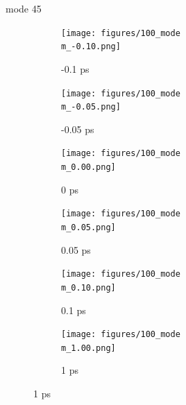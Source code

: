 \documentclass{beamer}
\newcommand\w{0.32}
\begin{document}
\renewcommand\m{45}
\begin{frame}{mode \m}
	\begin{figure}
		\centering
		\begin{subfigure}[b]{\w\textwidth}
			\centering
			\texttt{[image: figures/100\_mode\\m\_-0.10.png]}
			\caption{-0.1 ps}
		\end{subfigure}
		\begin{subfigure}[b]{\w\textwidth}
			\centering
			\texttt{[image: figures/100\_mode\\m\_-0.05.png]}
			\caption{-0.05 ps}
		\end{subfigure}
		\begin{subfigure}[b]{\w\textwidth}
			\centering
			\texttt{[image: figures/100\_mode\\m\_0.00.png]}
			\caption{0 ps}
		\end{subfigure}
		\begin{subfigure}[b]{\w\textwidth}
			\centering
			\texttt{[image: figures/100\_mode\\m\_0.05.png]}
			\caption{0.05 ps}
		\end{subfigure}
		\begin{subfigure}[b]{\w\textwidth}
			\centering
			\texttt{[image: figures/100\_mode\\m\_0.10.png]}
			\caption{0.1 ps}
		\end{subfigure}
		\begin{subfigure}[b]{\w\textwidth}
			\centering
			\texttt{[image: figures/100\_mode\\m\_1.00.png]}
			\caption{1 ps}
		\end{subfigure}
	\end{figure}
\end{frame}
\end{document}

